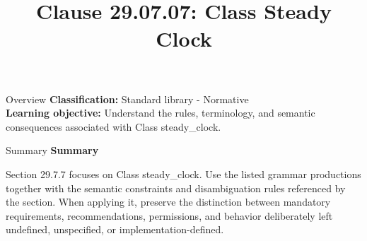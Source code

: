 \documentclass[10pt,letterpaper]{article}
\title{Clause 29.07.07: Class Steady Clock}
\author{}
\date{}
\begin{document}
\maketitle
\begin{CornellOverviewBox}{Overview}
\textbf{Classification:} Standard library - Normative\\[2pt]
\textbf{Learning objective:} Understand the rules, terminology, and semantic consequences associated with Class steady\_clock.
\end{CornellOverviewBox}\begin{CornellSummaryBox}{Summary}
{\sffamily\bfseries\color{Accent} Summary}\par\vspace{3pt}Section 29.7.7 focuses on Class steady\_clock. Use the listed grammar productions together with the semantic constraints and disambiguation rules referenced by the section. When applying it, preserve the distinction between mandatory requirements, recommendations, permissions, and behavior deliberately left undefined, unspecified, or implementation-defined.
\end{CornellSummaryBox}
\end{document}
